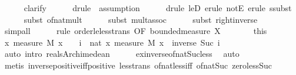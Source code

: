 \documentclass{article}
\theoremstyle{definition}
\begin{document}
\begin{isabellebody}
\ \ \ \ \isamarkupfalse%
\ clarify\isanewline
\ \ \ \ \isamarkupfalse%
\ {\isacharparenleft}drule\ {\isacharasterisk}{\isacharcomma}\ assumption{\isacharparenright}\isanewline
\ \ \ \ \isamarkupfalse%
\ {\isacharparenleft}drule\ leD{\isacharcomma}\ erule\ notE{\isacharcomma}\ erule\ ssubst{\isacharparenright}\isanewline
\ \ \ \ \isamarkupfalse%
\ {\isacharparenleft}subst\ of{\isacharunderscore}nat{\isacharunderscore}mult{\isacharparenright}\isanewline
\ \ \ \ \isamarkupfalse%
\ {\isacharparenleft}subst\ mult{\isachardot}assoc{\isacharparenright}\isanewline
\ \ \ \ \isamarkupfalse%
\ {\isacharparenleft}subst\ right{\isacharunderscore}inverse{\isacharparenright}\isanewline
\ \ \ \ \isamarkupfalse%
\ simp{\isacharunderscore}all\isanewline
\ \ \ \ \isamarkupfalse%
\ {\isacharparenleft}rule\ order{\isacharunderscore}le{\isacharunderscore}less{\isacharunderscore}trans\ {\isacharbrackleft}OF\ bounded{\isacharunderscore}measure\ X{\isacharbrackright}{\isacharparenright}\isanewline
\ \ \isacommand{{\isacharbraceright}}\isamarkupfalse%
\ \isamarkupfalse%
\ {\isacharasterisk}{\isacharasterisk}\ {\isacharequal}\ this\isanewline
\ \ \isamarkupfalse%
\ {\isachardoublequoteopen}{\isacharbraceleft}x{\isachardot}\ measure\ M\ {\isacharbraceleft}x{\isacharbraceright}\ {\isachargreater}\ {}{\isacharbraceright}\ {\isacharequal}\ {\isacharparenleft}{\isasymUnion}i\ {\isacharcolon}{\isacharcolon}\ nat{\isachardot}\ {\isacharbraceleft}x{\isachardot}\ measure\ M\ {\isacharbraceleft}x{\isacharbraceright}\ {\isachargreater}\ inverse\ {\isacharparenleft}Suc\ i{\isacharparenright}{\isacharbraceright}{\isacharparenright}{\isachardoublequoteclose}\isanewline
\ \ \ \ \isamarkupfalse%
\ {\isacharparenleft}auto\ intro{\isacharcolon}\ reals{\isacharunderscore}Archimedean{\isacharparenright}\isanewline
\ \ \ \ \isamarkupfalse%
\ ex{\isacharunderscore}inverse{\isacharunderscore}of{\isacharunderscore}nat{\isacharunderscore}Suc{\isacharunderscore}less\ \isamarkupfalse%
\ auto\isanewline
\ \ \ \ \isamarkupfalse%
\ {\isacharparenleft}metis\ inverse{\isacharunderscore}positive{\isacharunderscore}iff{\isacharunderscore}positive\ less{\isacharunderscore}trans\ of{\isacharunderscore}nat{\isacharunderscore}{}{\isacharunderscore}less{\isacharunderscore}iff\ of{\isacharunderscore}nat{\isacharunderscore}Suc\ zero{\isacharunderscore}less{\isacharunderscore}Suc{\isacharparenright}\isanewline

\end{isabellebody}
\end{document}
